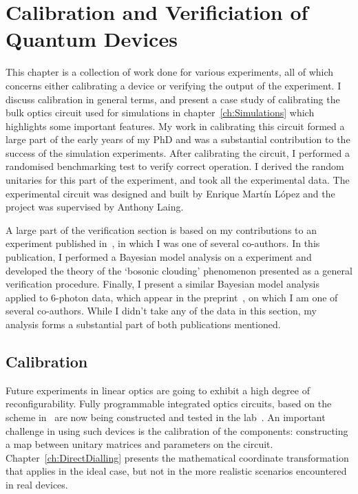 \chapter{Calibration and Verificiation of Quantum Devices}
\label{ch:QCV}
This chapter is a collection of work done for various experiments, all of which
concerns either calibrating a device or verifying the output of the experiment.
I discuss calibration in general terms, and present a case study of calibrating
the bulk optics circuit used for simulations in chapter~\ref{ch:Simulations}
which highlights some important features. My work in calibrating this circuit
formed a large part of the early years of my PhD and was a substantial
contribution to the success of the simulation experiments. After calibrating the
circuit, I performed a randomised benchmarking test to verify correct operation.
I derived the random unitaries for this part of the experiment, and took all
the experimental data. The experimental
circuit was designed and built by Enrique Mart\'in L\'opez and the project was
supervised by Anthony Laing.

A large part of the verification section is based on my contributions to an
experiment published in~\cite{verification}, in which I was one of several
co-authors. In this publication, I performed a Bayesian model analysis on a
\bosonsampling{} experiment and developed the theory of the `bosonic clouding'
phenomenon presented as a general verification procedure. Finally, I present a
similar Bayesian model analysis applied to 6-photon data, which appear in
the preprint~\cite{bigreck}, on which I am one of several co-authors. While I
didn't take any of the data in this section, my analysis forms a substantial
part of both publications mentioned.

\section{Calibration}
\label{sec:Calibration}
Future experiments in linear optics are going to exhibit a high degree of
reconfigurability. Fully programmable integrated optics circuits, based on the
scheme in~\cite{reck} are now being constructed and tested in the
lab~\cite{bigreck, qpp}. An important challenge in using such devices is the
calibration of the components: constructing a map between unitary matrices and
parameters on the circuit. Chapter~\ref{ch:DirectDialling} presents the
mathematical coordinate transformation that applies in the ideal case, but not
in the more realistic scenarios encountered in real devices.

